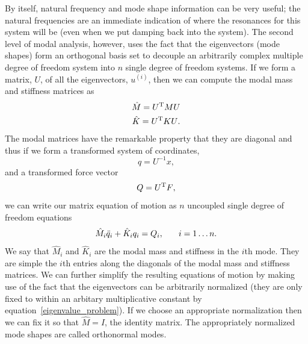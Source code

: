 By itself, natural frequency and mode shape information can be very useful;
the natural frequencies are an immediate indication of where the resonances
for this system will be (even when we put damping back into the system).
The second level of modal analysis, however, uses the fact that the 
eigenvectors (mode shapes) form an orthogonal basis set to
decouple an arbitrarily complex multiple degree of freedom system into
$n$ single degree of freedom systems.  If we form a matrix, $U$, of all the
eigenvectors, $u^{(i)}$, then we can compute the modal mass and stiffness
matrices as
\begin{eqnarray}
{\hat M} = {U^{\rm T} M U} \\
{\hat K} = {U^{\rm T} K U}.
\end{eqnarray}
The modal matrices have the remarkable property that they are diagonal
and thus if we form a transformed system of coordinates,
\begin{equation}
q = {U^{-1} x},
\end{equation}
and a transformed force vector
\begin{equation}
Q = {U^{\rm T} F},
\end{equation}
we can write our matrix equation of motion as $n$ uncoupled 
single degree of freedom equations
\begin{equation}
{{\hat M}_{i} {\ddot q}_{i} + {\hat K}_{i} q_{i}} = {Q_{i}}, \hspace{0.25in} i = 1 \ldots n.
\end{equation}
We say that ${\hat M}_i$ and ${\hat K}_i$ are the modal mass and stiffness
in the $i$th mode.  They are simple the $i$th entries along the diagonals
of the modal mass and stiffness matrices.  We can further simplify the
resulting equations of motion by making use of the fact that the
eigenvectors can be arbitrarily normalized (they are only fixed to within
an arbitary multiplicative constant by equation~\ref{eigenvalue_problem}).
If we choose an appropriate normalization then we can fix it so that 
${\hat M} = I$, the identity matrix.  The appropriately normalized
mode shapes are called orthonormal modes.

